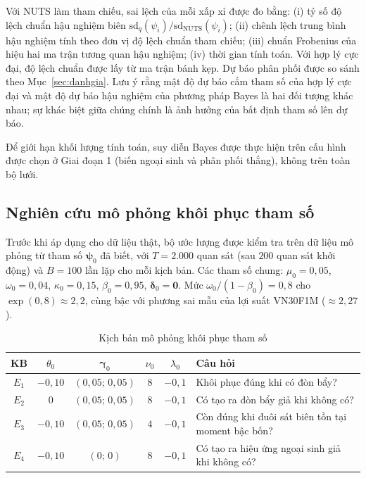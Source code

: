 \documentclass[12pt,a4paper]{article}
\theoremstyle{definition}
\theoremstyle{remark}
\newcommand{\bpsi}{\boldsymbol{\psi}}
\newcommand{\bgamma}{\boldsymbol{\gamma}}
\newcommand{\bdelta}{\boldsymbol{\delta}}
\begin{document}
Với NUTS làm tham chiếu, sai lệch của mỗi xấp xỉ được đo bằng: (i) tỷ số độ lệch chuẩn hậu nghiệm biên $\mathrm{sd}_q(\psi_i)/\mathrm{sd}_{\mathrm{NUTS}}(\psi_i)$; (ii) chênh lệch trung bình hậu nghiệm tính theo đơn vị độ lệch chuẩn tham chiếu; (iii) chuẩn Frobenius của hiệu hai ma trận tương quan hậu nghiệm; (iv) thời gian tính toán. Với hợp lý cực đại, độ lệch chuẩn được lấy từ ma trận bánh kẹp. Dự báo phân phối được so sánh theo Mục~\ref{sec:danhgia}. Lưu ý rằng mật độ dự báo cắm tham số của hợp lý cực đại và mật độ dự báo hậu nghiệm của phương pháp Bayes là hai đối tượng khác nhau; sự khác biệt giữa chúng chính là ảnh hưởng của bất định tham số lên dự báo.

Để giới hạn khối lượng tính toán, suy diễn Bayes được thực hiện trên cấu hình được chọn ở Giai đoạn 1 (biến ngoại sinh và phân phối thắng), không trên toàn bộ lưới.

\subsection{Nghiên cứu mô phỏng khôi phục tham số}\label{sec:mophongkhoiphuc}

Trước khi áp dụng cho dữ liệu thật, bộ ước lượng được kiểm tra trên dữ liệu mô phỏng từ tham số $\bpsi_0$ đã biết, với $T=2.000$ quan sát (sau $200$ quan sát khởi động) và $B=100$ lần lặp cho mỗi kịch bản. Các tham số chung: $\mu_0=0{,}05$, $\omega_0=0{,}04$, $\kappa_0=0{,}15$, $\beta_0=0{,}95$, $\bdelta_0=\mathbf 0$. Mức $\omega_0/(1-\beta_0)=0{,}8$ cho $\exp(0{,}8)\approx2{,}2$, cùng bậc với phương sai mẫu của lợi suất VN30F1M ($\approx2{,}27$).

\begin{table}[h]
\centering
\caption{Kịch bản mô phỏng khôi phục tham số}\label{tab:khoiphuc}
\begin{tabular}{@{}cccccp{5.4cm}@{}}
\toprule
\textbf{KB} & $\theta_0$ & $\bgamma_0$ & $\nu_0$ & $\lambda_0$ & \textbf{Câu hỏi} \\
\midrule
$E_1$ & $-0{,}10$ & $(0{,}05;\,0{,}05)$ & $8$ & $-0{,}1$ & Khôi phục đúng khi có đòn bẩy? \\
$E_2$ & $0$ & $(0{,}05;\,0{,}05)$ & $8$ & $-0{,}1$ & Có tạo ra đòn bẩy giả khi không có? \\
$E_3$ & $-0{,}10$ & $(0{,}05;\,0{,}05)$ & $4$ & $-0{,}1$ & Còn đúng khi đuôi sát biên tồn tại moment bậc bốn? \\
$E_4$ & $-0{,}10$ & $(0;\,0)$ & $8$ & $-0{,}1$ & Có tạo ra hiệu ứng ngoại sinh giả khi không có? \\
\bottomrule
\end{tabular}
\end{table}
\end{document}
